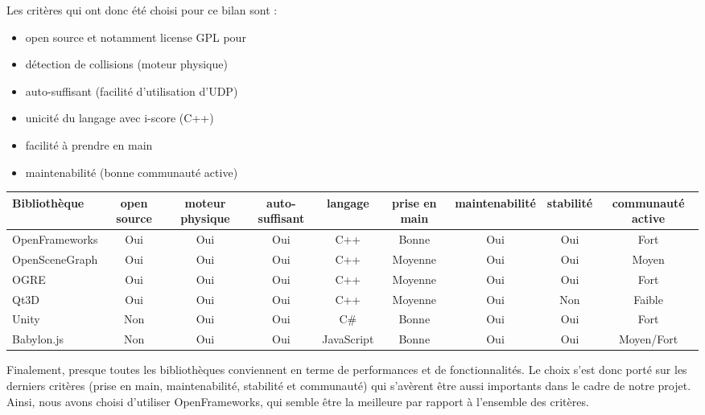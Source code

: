 Les critères qui ont donc été choisi pour ce bilan sont : 
\begin{itemize}
\item open source et notamment license GPL pour 
\item détection de collisions (moteur physique)
\item auto-suffisant (facilité d'utilisation d'UDP)
\item unicité du langage avec i-score (C++)
\item facilité à prendre en main
\item maintenabilité (bonne communauté active)
\end{itemize} 
 

\newpage
\begin{landscape}
\hspace{-4.5cm} 
\begin{tabular}{l|c|c|c|c|c|c|c|c}
Bibliothèque & open source & moteur physique & auto-suffisant & langage & prise en main & maintenabilité & stabilité & communauté active\\
\hline
OpenFrameworks & Oui & Oui & Oui & C++ & Bonne & Oui & Oui & Fort\\
OpenSceneGraph & Oui & Oui & Oui & C++ & Moyenne & Oui & Oui & Moyen\\ 
OGRE & Oui & Oui & Oui & C++ & Moyenne & Oui & Oui & Fort\\
Qt3D & Oui & Oui & Oui & C++ & Moyenne & Oui & Non & Faible\\
Unity & Non & Oui & Oui & C\# & Bonne & Oui & Oui & Fort\\
Babylon.js  & Non & Oui & Oui & JavaScript & Bonne & Oui & Oui & Moyen/Fort
\end{tabular}
\end{landscape}

Finalement, presque toutes les bibliothèques conviennent en terme de performances et de fonctionnalités. Le choix s'est donc porté sur les derniers critères (prise en main, maintenabilité, stabilité et communauté) qui s'avèrent être aussi importants dans le cadre de notre projet. Ainsi, nous avons choisi d'utiliser OpenFrameworks, qui semble être la meilleure par rapport à l'ensemble des critères.  
